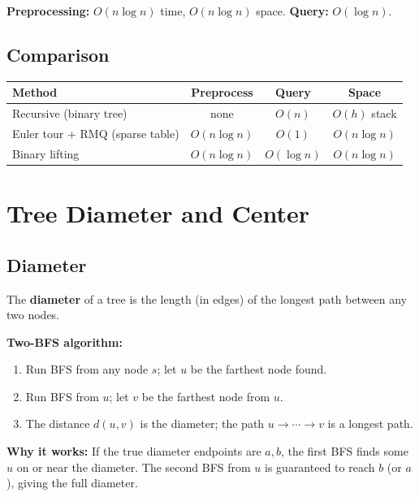 \textbf{Preprocessing:} $O(n \log n)$ time, $O(n \log n)$ space.
\textbf{Query:} $O(\log n)$.

\subsection{Comparison}

\begin{center}
\begin{tabular}{lccc}
\toprule
Method & Preprocess & Query & Space \\
\midrule
Recursive (binary tree) & none & $O(n)$ & $O(h)$ stack \\
Euler tour + RMQ (sparse table) & $O(n \log n)$ & $O(1)$ & $O(n \log n)$ \\
Binary lifting & $O(n \log n)$ & $O(\log n)$ & $O(n \log n)$ \\
\bottomrule
\end{tabular}
\end{center}

\section{Tree Diameter and Center}

\subsection{Diameter}

The \textbf{diameter} of a tree is the length (in edges) of the
longest path between any two nodes.

\textbf{Two-BFS algorithm:}
\begin{enumerate}
\item Run BFS from any node $s$; let $u$ be the farthest node found.
\item Run BFS from $u$; let $v$ be the farthest node from $u$.
\item The distance $d(u,v)$ is the diameter; the path $u \to \cdots \to
      v$ is a longest path.
\end{enumerate}

\textbf{Why it works:} If the true diameter endpoints are $a,b$,
the first BFS finds some $u$ on or near the diameter.  The second
BFS from $u$ is guaranteed to reach $b$ (or $a$), giving the full
diameter.

